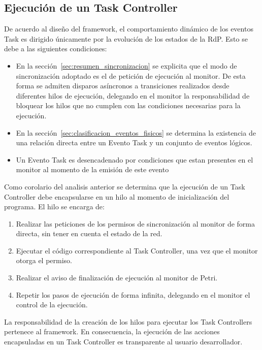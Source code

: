 \subsection{Ejecución de un Task Controller}
\label{sec:ejecucion_task_controller}
De acuerdo al diseño del framework, el comportamiento dinámico de los eventos
Task es dirigido únicamente por la evolución de los estados de la RdP. Esto se
debe a las siguientes condiciones:
\begin{itemize}
    \item En la sección~\ref{sec:resumen_sincronizacion} se explicita que el
    modo de sincronización adoptado es el de petición de ejecución al monitor. De
    esta forma se admiten disparos asíncronos a transiciones realizados desde
    diferentes hilos de ejecución, delegando en el monitor la responsabilidad de
    bloquear los hilos que no cumplen con las condiciones necesarias para la ejecución.

    \item En la sección~\ref{sec:clasificacion_eventos_fisicos} se determina la
    existencia de una relación directa entre un Evento Task y un conjunto de
    eventos lógicos.

    \item Un Evento Task es desencadenado por condiciones que estan presentes en el
    monitor al momento de la emisión de este evento
\end{itemize}

Como corolario del analisis anterior se determina que la ejecución de un Task
Controller debe encapsularse en un hilo al momento de inicialización del
programa.
El hilo se encarga de:
\begin{enumerate}
  \item Realizar las peticiones de los permisos de sincronización al
  monitor de forma directa, sin tener en cuenta el estado de la red.
  \item  Ejecutar el código correspondiente al Task Controller, una vez que el
  monitor otorga el permiso.
  \item  Realizar el aviso de finalización de ejecución al monitor de Petri.
  \item Repetir los pasos de ejecución de forma infinita, delegando en el
  monitor el control de la ejecución.
\end{enumerate}

La responsabilidad de la creación de los hilos para ejecutar los Task
Controllers pertenece al framework. En consecuencia, la ejecución de las
acciones encapsuladas en un Task Controller es transparente al usuario
desarrollador.

